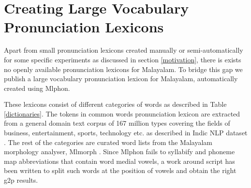 \documentclass{ieeeaccess}
\begin{document}

\section{Creating Large Vocabulary Pronunciation Lexicons}
\label{pronunciationdictionary}

Apart from small pronunciation lexicons created manually or semi-automatically for some specific experiments as discussed in section \ref{motivation},  there is exists no openly available pronunciation lexicons for Malayalam. To bridge this gap we publish a large vocabulary pronunciation lexicon for Malayalam, automatically created using Mlphon. 


These lexicons consist of different categories of words as described in Table \ref{dictionaries}. The tokens in common words pronunciation lexicon are extracted from a general domain text corpus of 167 million types covering the fields of business, entertainment, sports, technology etc. as described in Indic NLP dataset \cite{kunchukuttan2020ai4bharat}. The rest of the categories are curated word lists from the Malayalam morphology analyser, Mlmorph \cite{thottingal-2019-finite}. Since Mlphon fails to syllabify and phoneme map abbreviations that contain word medial vowels, a work around script has been written to split such words at the position of vowels and obtain the right g2p results. 
\end{document}
